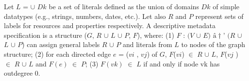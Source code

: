 \documentclass[12pt]{article}
\begin{document}
Let $L$ = $\cup$ $Dk$ be a set of literals defined as the union of
domains $Dk$ of simple datatypes (e.g., strings, numbers, dates, etc.). Let also $R$ and $P$ represent sets of labels for resources and properties respectively. A descriptive metadata specification is a structure ($G$, $R$ $\cup$ $L$ $\cup$ $P$, $F$), where:
(1) $F$ : $(V$  $\cup$ $ E)$ $â†’$ $(R$ $\cup$ $L$ $\cup$ $P$) can assign general labels $R$ $\cup$ $P$ and literals from $L$ to nodes of the graph structure;
(2) for each directed edge $e$ = ($vi$ , $vj$) of $G$, $F$($vi$) $\in$ $R$ $\cup$ $L$, $F$($vj$ ) $\in$ $R$ $\cup$ $L$ and $F(e)$ $\in$ $P$;
(3) $F(vk)$ $\in$ $L$ if and only if node vk has outdegree 0.
\end{document}
